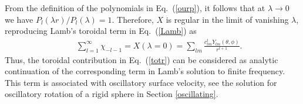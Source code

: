 \documentclass[aps,prx,twocolumn,amsmath,amssymb,amsfonts]{revtex4-2}
\begin{document}
From the definition of the polynomials in Eq.~(\ref{ourp}), it follows that at $\lambda\!\to\!0$ we have $P_l(\lambda r)/P_l(\lambda)=1$. Therefore, $X$ is regular in the limit of vanishing $\lambda$, reproducing Lamb's toroidal term in Eq.~(\ref{Lamb}) as
\begin{eqnarray}&&\!\!\!\!\!\!\!\!\!\!\!\!
\sum_{l=1}^{\infty}\chi_{-l-1}=X(\lambda=0)\!=\!%
\sum_{lm} \frac{c^t_{lm}Y_{lm}(\theta, \phi)}{r^{l+1}}.\label{cdox}
\end{eqnarray}
Thus, the toroidal contribution in Eq.~(\ref{totr}) can be considered as analytic continuation of the corresponding term in Lamb's solution to finite frequency. This term is associated with oscillatory surface velocity, see the solution for oscillatory rotation of a rigid sphere in Section \ref{oscillating}.
\end{document}
